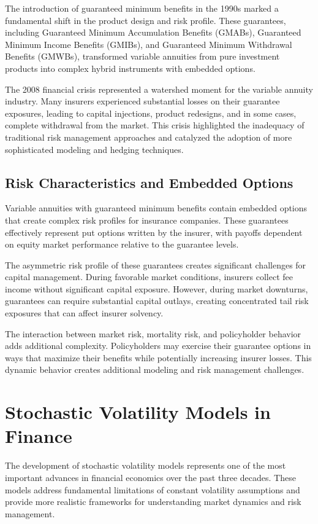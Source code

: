 \documentclass[12pt,a4paper]{report}
\begin{document}
The introduction of guaranteed minimum benefits in the 1990s marked a fundamental shift in the product design and risk profile. These guarantees, including Guaranteed Minimum Accumulation Benefits (GMABs), Guaranteed Minimum Income Benefits (GMIBs), and Guaranteed Minimum Withdrawal Benefits (GMWBs), transformed variable annuities from pure investment products into complex hybrid instruments with embedded options.

The 2008 financial crisis represented a watershed moment for the variable annuity industry. Many insurers experienced substantial losses on their guarantee exposures, leading to capital injections, product redesigns, and in some cases, complete withdrawal from the market. This crisis highlighted the inadequacy of traditional risk management approaches and catalyzed the adoption of more sophisticated modeling and hedging techniques.

\subsection{Risk Characteristics and Embedded Options}

Variable annuities with guaranteed minimum benefits contain embedded options that create complex risk profiles for insurance companies. These guarantees effectively represent put options written by the insurer, with payoffs dependent on equity market performance relative to the guarantee levels.

The asymmetric risk profile of these guarantees creates significant challenges for capital management. During favorable market conditions, insurers collect fee income without significant capital exposure. However, during market downturns, guarantees can require substantial capital outlays, creating concentrated tail risk exposures that can affect insurer solvency.

The interaction between market risk, mortality risk, and policyholder behavior adds additional complexity. Policyholders may exercise their guarantee options in ways that maximize their benefits while potentially increasing insurer losses. This dynamic behavior creates additional modeling and risk management challenges.

\section{Stochastic Volatility Models in Finance}

The development of stochastic volatility models represents one of the most important advances in financial economics over the past three decades. These models address fundamental limitations of constant volatility assumptions and provide more realistic frameworks for understanding market dynamics and risk management.
\end{document}
